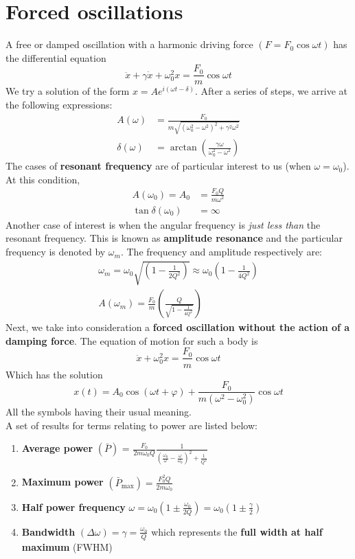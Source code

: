 \documentclass[a4paper]{article}
\begin{document}
\section{Forced oscillations}
A free or damped oscillation with a harmonic driving force $(F = F_0\cos{\omega t})$ has the differential equation 
\begin{equation*}
    \ddot{x} + \gamma\dot{x} + \omega_0^2 x = \frac{F_0}{m}\cos{\omega t}
\end{equation*}
We try a solution of the form $x=Ae^{i(\omega t-\delta)}$. After a series of steps, we arrive at the following expressions:
\begin{align*}
    A(\omega) &= \frac{F_0}{m\sqrt{(\omega_0^2-\omega^2)^2+\gamma^2\omega^2}}\\
   \delta(\omega) &= \arctan{\left(\frac{\gamma\omega}{\omega_0^2-\omega^2}\right)} 
\end{align*}
The cases of \textbf{resonant frequency} are of particular interest to us (when $\omega = \omega_0$). At this condition, 
\begin{align*}
    A(\omega_0) = A_0 &= \frac{F_0Q}{m\omega^2}\\
    \tan{\delta(\omega_0)} &= \infty
\end{align*}
Another case of interest is when the angular frequency is \textit{just less than} the resonant frequency. This is known as \textbf{amplitude resonance} and the particular frequency is denoted by $\omega_m$. The frequency and amplitude respectively are:
\begin{align*}
    \omega_m = \omega_0\sqrt{\left(1-\frac{1}{2Q^2}\right)} \approx \omega_0\left(1-\frac{1}{4Q^2}\right)\\
    A(\omega_m) = \frac{F_0}{m}\left(\frac{Q}{\sqrt{1-\frac{1}{4Q^2}}}\right)
\end{align*}
Next, we take into consideration a \textbf{forced oscillation without the action of a damping force}. The equation of motion for such a body is
\begin{equation*}
    \ddot{x} + \omega_0^2x = \frac{F_0}{m}\cos{\omega t}
\end{equation*}
Which has the solution
\begin{equation*}
    x(t) = A_0\cos{(\omega t+\varphi)} + \frac{F_0}{m(\omega^2-\omega_0^2)}\cos{\omega t}
\end{equation*}
All the symbols having their usual meaning.\\
A set of results for terms relating to power are listed below:
\begin{enumerate}
    \item \textbf{Average power} $(\bar{P})$ = $\frac{F_0}{2m\omega_0 Q}\frac{1}{\left(\frac{\omega_0}{\omega}-\frac{\omega}{\omega_0}\right)^2 + \frac{1}{Q^2}}$
    \item \textbf{Maximum power} $(\bar{P}_{\text{max}}) = \frac{F_0^2Q}{2m\omega_0}$
    \item \textbf{Half power frequency} $\omega = \omega_0\left(1\pm\frac{\omega_0}{2Q}\right) = \omega_0\left(1\pm\frac{\gamma}{2}\right) $
    \item \textbf{Bandwidth} $(\Delta\omega) = \gamma = \frac{\omega_0}{Q}$ which represents the \textbf{full width at half maximum} (FWHM)
\end{enumerate}
\end{document}

